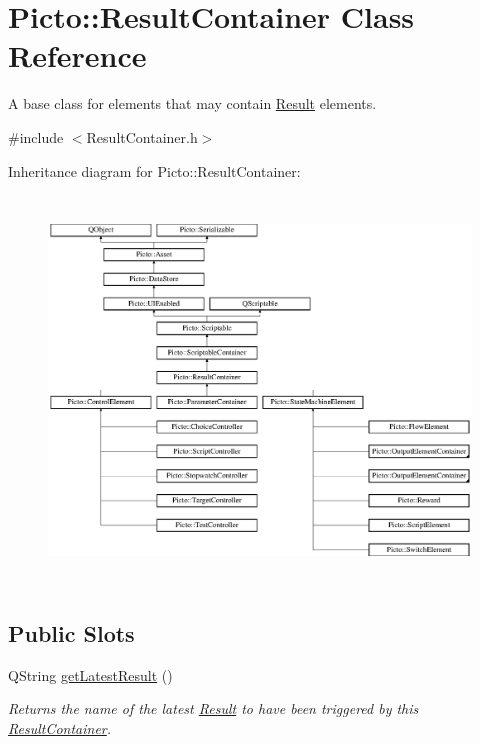\hypertarget{class_picto_1_1_result_container}{\section{Picto\-:\-:Result\-Container Class Reference}
\label{class_picto_1_1_result_container}
}


A base class for elements that may contain \hyperlink{class_picto_1_1_result}{Result} elements.  




{\ttfamily \#include $<$Result\-Container.\-h$>$}

Inheritance diagram for Picto\-:\-:Result\-Container\-:\begin{figure}[H]
\begin{center}
\leavevmode
\includegraphics[height=10.315789cm]{class_picto_1_1_result_container}
\end{center}
\end{figure}
\subsection*{Public Slots}
\begin{DoxyCompactItemize}
\item 
Q\-String \hyperlink{class_picto_1_1_result_container_ada1e696915489f882b994774b4a2bf63}{get\-Latest\-Result} ()
\begin{DoxyCompactList}\small\item\em Returns the name of the latest \hyperlink{class_picto_1_1_result}{Result} to have been triggered by this \hyperlink{class_picto_1_1_result_container}{Result\-Container}. \end{DoxyCompactList}\end{DoxyCompactItemize}
